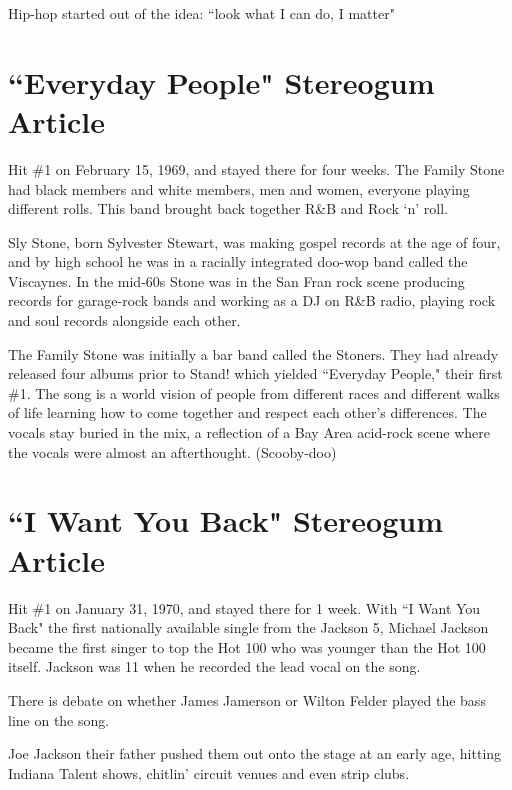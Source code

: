 \documentclass[12pt, a4paper, twoside, openright, titlepage]{book}
\begin{document}
\begin{rmk}{}{}
    Hip-hop started out of the idea: ``look what I can do, I matter"
\end{rmk}










\section{``Everyday People" Stereogum Article}

Hit \#1 on February 15, 1969, and stayed there for four weeks. The Family Stone had black members and white members, men and women, everyone playing different rolls. This band brought back together R\&B and Rock `n' roll.

Sly Stone, born Sylvester Stewart, was making gospel records at the age of four, and by high school he was in a racially integrated doo-wop band called the Viscaynes. In the mid-60s Stone was in the San Fran rock scene producing records for garage-rock bands and working as a DJ on R\&B radio, playing rock and soul records alongside each other. 

The Family Stone was initially a bar band called the Stoners. They had already released four albums prior to Stand! which yielded ``Everyday People," their first \#1. The song is a world vision of people from different races and different walks of life learning how to come together and respect each other's differences. The vocals stay buried in the mix, a reflection of a Bay Area acid-rock scene where the vocals were almost an afterthought. (Scooby-doo)



\section{``I Want You Back" Stereogum Article}

Hit \#1 on January 31, 1970, and stayed there for 1 week. With ``I Want You Back" the first nationally available single from the Jackson 5, Michael Jackson became the first singer to top the Hot 100 who was younger than the Hot 100 itself. Jackson was 11 when he recorded the lead vocal on the song.

There is debate on whether James Jamerson or Wilton Felder played the bass line on the song.

Joe Jackson their father pushed them out onto the stage at an early age, hitting Indiana Talent shows, chitlin' circuit venues and even strip clubs. 
\end{document}

